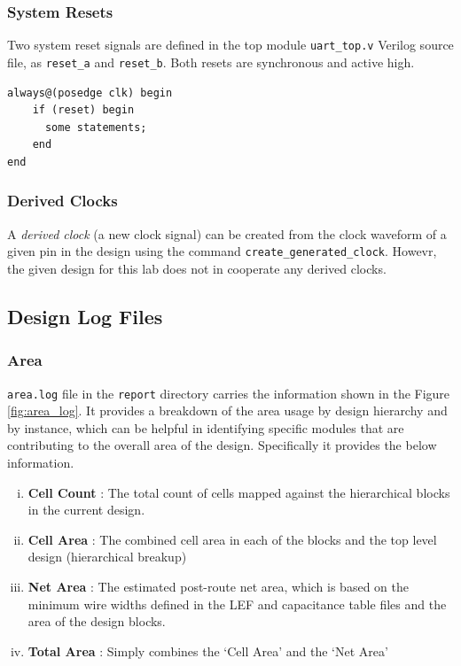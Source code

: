 \documentclass[a4paper,11pt]{article}%
\begin{document}
\subsubsection{System Resets}
Two system reset signals are defined in the top module {\tt uart\_top.v} Verilog source file, as {\tt reset\_a}  and {\tt reset\_b}. Both resets are synchronous and active high.

\begin{Verbatim}[frame=single]
always@(posedge clk) begin	
    if (reset) begin
      some statements;	   
    end
end
\end{Verbatim}

\subsubsection{Derived Clocks}

A \textit{derived clock} (a new clock signal) can be created from the clock waveform of a given pin in the design using the command {\tt create\_generated\_clock}\cite{genus_command_ref_2019}. Howevr, the given design for this lab does not in cooperate any derived clocks.

\subsection{Design Log Files}

\subsubsection{Area}

{\tt area.log} file in the {\tt report} directory carries the information shown in the Figure \ref{fig:area_log}. It provides a breakdown of the area usage by design hierarchy and by instance, which can be helpful in identifying specific modules that are contributing to the overall area of the design. Specifically it provides the below information\cite{genus_command_ref_2019}.

\begin{enumerate}[i.]
	\item \textbf{{Cell Count}} : The total count of cells mapped against the hierarchical blocks in the current design.
	
	\item \textbf{{Cell Area}} : The combined cell area in each of the blocks and the top level design (hierarchical breakup)
	
	\item \textbf{{Net Area}} : The estimated post-route net area, which is based on the minimum wire widths defined in the LEF and capacitance table files and the area of the design blocks.
	
	\item \textbf{{Total Area}} : Simply combines the `Cell Area' and the `Net Area'
\end{enumerate}
\end{document}
